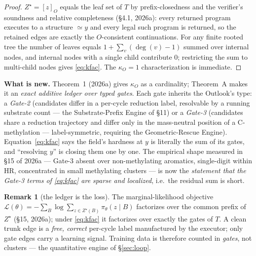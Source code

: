 \documentclass[11pt]{article}
\theoremstyle{plain}
\theoremstyle{definition}
\newtheorem{remark}{Remark}
\newcommand{\Zstar}{Z^{\star}}
\newcommand{\kO}{\kappa_{O}}
\newcommand{\Defn}[1]{\emph{#1}}
\begin{document}
\begin{proof}
$\Zstar=[z]_O$ equals the leaf set of $T$ by prefix-closedness and the verifier's soundness and relative completeness (\S4.1, 2026a): every returned program executes to a structure $\simeq y$ and every legal such program is returned, so the retained edges are exactly the $O$-consistent continuations. For any finite rooted tree the number of leaves equals $1+\sum_{v}(\deg(v)-1)$ summed over internal nodes, and internal nodes with a single child contribute $0$; restricting the sum to multi-child nodes gives \eqref{eq:kfac}. The $\kO=1$ characterization is immediate.
\end{proof}

\noindent\textbf{What is new.} Theorem~1 (2026a) gives $\kO$ as a cardinality; Theorem~A makes it an \emph{exact additive ledger over typed gates}. Each gate inherits the Outlook's type: a \Defn{Gate-2} (candidates differ in a per-cycle reduction label, resolvable by a running substrate count --- the Substrate-Prefix Engine of \S11) or a \Defn{Gate-3} (candidates share a reduction trajectory and differ only in the mass-neutral position of a C-methylation --- label-symmetric, requiring the Geometric-Rescue Engine). Equation~\eqref{eq:kfac} says the field's hardness at $y$ is literally the sum of its gates, and ``resolving $y$'' is closing them one by one. The empirical shape measured in \S15 of 2026a --- Gate-3 absent over non-methylating aromatics, single-digit within HR, concentrated in small methylating clusters --- is now the \emph{statement that the Gate-3 terms of \eqref{eq:kfac} are sparse and localized}, i.e.\ the residual sum is short.

\begin{remark}[the ledger is the loss]
The marginal-likelihood objective $\mathcal{L}(\theta)=-\sum_B\log\sum_{z\in\Zstar(B)}\pi_\theta(z\mid B)$ factorizes over the common prefix of $\Zstar$ (\S15, 2026a); under \eqref{eq:kfac} it factorizes over exactly the gates of $T$. A clean trunk edge is a \emph{free, correct} per-cycle label manufactured by the executor; only gate edges carry a learning signal. Training data is therefore counted in \emph{gates}, not clusters --- the quantitative engine of \S\ref{sec:loop}.
\end{remark}
\end{document}
